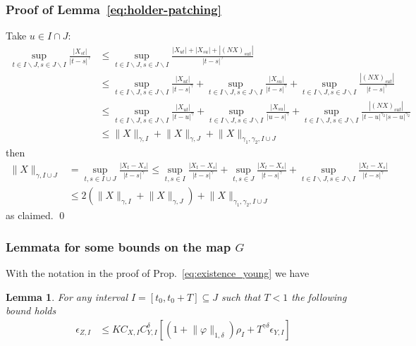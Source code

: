 \documentclass[a4paper,12pt,reqno]{amsproc}
\newcommand{\NN}{N}
\newcommand{\norm}[1]{\lVert #1\rVert}
\newtheorem{lemma}{Lemma}
\begin{document}
\subsubsection{Proof of Lemma~\ref{eq:holder-patching}}
\label{sec:proof-holder-patching}
\proof
Take $ u \in I \cap J$:
\begin{equation*}
  \begin{split}
\sup_{t \in I\backslash J ,s \in J\backslash I}
  \frac{|X_{st}|}{|t-s|^\gamma} & \le
\sup_{t \in I\backslash J ,s \in J\backslash I}
  \frac{|X_{ut}|+|X_{su}|+|(\NN X)_{sut}|}{|t-s|^\gamma}  
\\ &  \le
\sup_{t \in I\backslash J ,s \in J\backslash I}
  \frac{|X_{ut}|}{|t-s|^\gamma}  
+\sup_{t \in I\backslash J ,s \in J\backslash I}
  \frac{|X_{su}|}{|t-s|^\gamma}      
+\sup_{t \in I\backslash J ,s \in J\backslash I}
  \frac{|(\NN X)_{sut}|}{|t-s|^\gamma}      
\\ &  \le
\sup_{t \in I\backslash J ,s \in J\backslash I}
  \frac{|X_{ut}|}{|t-u|^\gamma}  
+\sup_{t \in I\backslash J ,s \in J\backslash I}
  \frac{|X_{su}|}{|u-s|^\gamma}      
+\sup_{t \in I\backslash J ,s \in J\backslash I}
  \frac{|(\NN X)_{sut}|}{|t-u|^{\gamma_2} |s-u|^{\gamma_2}}      
\\ & \le
  \norm{X}_{\gamma,I}+\norm{X}_{\gamma,J}+\norm{X}_{\gamma_1,\gamma_2,I
  \cup J}
  \end{split}
\end{equation*}
then
\begin{equation*}
  \begin{split}
  \norm{X}_{\gamma,I \cup J} &= \sup_{t,s \in I \cup J}
  \frac{|X_{t}-X_s|}{|t-s|^\gamma} \le \sup_{t ,s \in I }
  \frac{|X_{t}-X_s|}{|t-s|^\gamma} + \sup_{t,s \in  J}
  \frac{|X_{t}-X_s|}{|t-s|^\gamma} + \sup_{t \in I\backslash J ,s \in
  J\backslash I}
  \frac{|X_{t}-X_s|}{|t-s|^\gamma} 
\\ & \le     2 (\norm{X}_{\gamma,I}+\norm{X}_{\gamma,J}) +\norm{X}_{\gamma_1,\gamma_2,I
  \cup J}
  \end{split}
\end{equation*}
as claimed.
\qed

\subsubsection{Lemmata for some bounds on the map $G$}
With the notation in the proof of Prop.~\ref{eq:existence_young} we have
\begin{lemma}
\label{lemma:zetabound-young}
For any interval $I=[t_0,t_0+T] \subseteq J$ such that $T<1$
the following bound holds
\begin{equation}
\label{eq:epsilonZbound-young-lemma}
  \begin{split}
  \epsilon_{Z,I} &  \le K  C_{X,I}
  C_{Y,I}^\delta [(1+\norm{\varphi}_{1,\delta})\rho_I + T^{\gamma\delta} \epsilon_{Y,I}]
  \end{split}
\end{equation}
\end{lemma}
\end{document}
